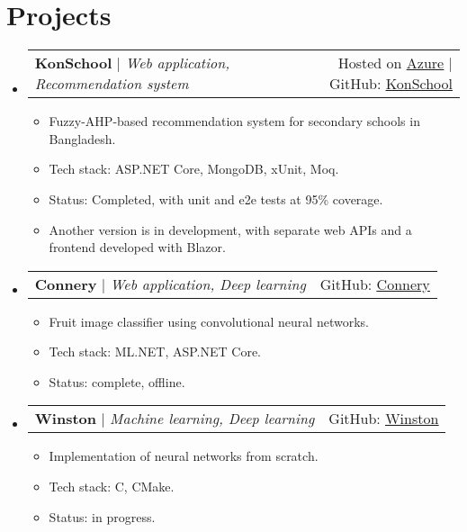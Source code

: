 \documentclass[11pt,a4paper]{article}
\makeatletter
\newcommand{\resumeItem}[1]{
  \item{
    {#1 \vspace{-2pt}}
  }
}
\newcommand{\resumeProjectHeading}[2]{
    \item
    \begin{tabular*}{1.001\textwidth}{l@{\extracolsep{\fill}}r}
      \small#1 & \small #2\\
    \end{tabular*}\vspace{-7pt}
}
\newcommand{\resumeSubHeadingListStart}{\begin{itemize}[leftmargin=0.0in, label={}]}
\newcommand{\resumeSubHeadingListEnd}{\end{itemize}}
\newcommand{\resumeItemListStart}{\begin{itemize}}
\newcommand{\resumeItemListEnd}{\end{itemize}\vspace{-5pt}}
\makeatother
\begin{document}
\section{Projects}
    \vspace{-5pt}
    \resumeSubHeadingListStart
      \resumeProjectHeading
          {\textbf{KonSchool} $|$ \emph{Web application, Recommendation system}}{Hosted on \href{https://konschool.azurewebsite.net}{\underline{Azure}} $|$ GitHub: \href{https://github.com/maacpiash/KonSchool}{\underline{KonSchool}}}
          \resumeItemListStart
            \resumeItem{Fuzzy-AHP-based recommendation system for secondary schools in Bangladesh.}
            \resumeItem{Tech stack: ASP.NET Core, MongoDB, xUnit, Moq.}
            \resumeItem{Status: Completed, with unit and e2e tests at 95\% coverage.}
            \resumeItem{Another version is in development, with separate web APIs and a frontend developed with Blazor.}
          \resumeItemListEnd
          \vspace{-13pt}
      \resumeProjectHeading
          {\textbf{Connery} $|$ \emph{Web application, Deep learning}}{GitHub: \href{https://github.com/maacpiash/Connery}{\underline{Connery}}}
          \resumeItemListStart
            \resumeItem{Fruit image classifier using convolutional neural networks.}
            \resumeItem{Tech stack: ML.NET, ASP.NET Core.}
            \resumeItem{Status: complete, offline.}
          \resumeItemListEnd 
          \vspace{-13pt}
          \resumeProjectHeading
          {\textbf{Winston} $|$ \emph{Machine learning, Deep learning}}{GitHub: \href{https://github.com/maacpiash/Winston}{\underline{Winston}}}
          \resumeItemListStart
            \resumeItem{Implementation of neural networks from scratch.}
            \resumeItem{Tech stack: C, CMake.}
            \resumeItem{Status: in progress.}
          \resumeItemListEnd 
    \resumeSubHeadingListEnd
\vspace{-15pt}


\end{document}
